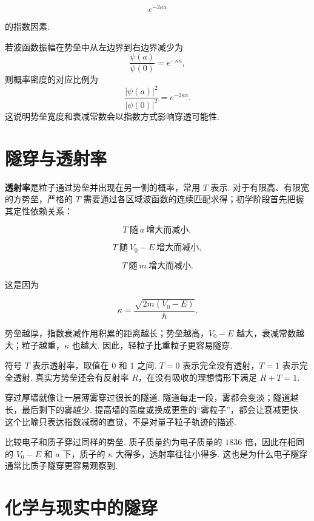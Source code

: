 \documentclass[UTF8,11pt,a4paper,openany]{ctexbook}
\newcommand{\term}[1]{\textbf{#1}}
\begin{document}
\[
e^{-2\kappa a}
\]

的指数因素. 

\begin{derivationbox}
若波函数振幅在势垒中从左边界到右边界减少为
\[
\frac{\psi(a)}{\psi(0)}=e^{-\kappa a},
\]
则概率密度的对应比例为
\[
\frac{|\psi(a)|^2}{|\psi(0)|^2}
=e^{-2\kappa a}.
\]
这说明势垒宽度和衰减常数会以指数方式影响穿透可能性. 
\end{derivationbox}

\section{隧穿与透射率}

\term{透射率}是粒子通过势垒并出现在另一侧的概率，常用 $T$ 表示. 对于有限高、有限宽的方势垒，严格的 $T$ 需要通过各区域波函数的连续匹配求得；初学阶段首先把握其定性依赖关系：

\[
T\ \text{随}\ a\ \text{增大而减小},
\]

\[
T\ \text{随}\ V_0-E\ \text{增大而减小},
\]

\[
T\ \text{随}\ m\ \text{增大而减小}.
\]

这是因为

\[
\kappa=\frac{\sqrt{2m(V_0-E)}}{\hbar}.
\]

势垒越厚，指数衰减作用积累的距离越长；势垒越高，$V_0-E$ 越大，衰减常数越大；粒子越重，$\kappa$ 也越大. 因此，轻粒子比重粒子更容易隧穿. 

\begin{notationbox}
符号 $T$ 表示透射率，取值在 $0$ 和 $1$ 之间. $T=0$ 表示完全没有透射，$T=1$ 表示完全透射. 真实方势垒还会有反射率 $R$，在没有吸收的理想情形下满足 $R+T=1$. 
\end{notationbox}

\begin{analogybox}
穿过厚墙就像让一层薄雾穿过很长的隧道. 隧道每走一段，雾都会变淡；隧道越长，最后剩下的雾越少. 提高墙的高度或换成更重的“雾粒子”，都会让衰减更快. 这个比喻只表达指数减弱的直觉，不是对量子粒子轨迹的描述. 
\end{analogybox}

\begin{examplebox}
比较电子和质子穿过同样的势垒. 质子质量约为电子质量的 $1836$ 倍，因此在相同的 $V_0-E$ 和 $a$ 下，质子的 $\kappa$ 大得多，透射率往往小得多. 这也是为什么电子隧穿通常比质子隧穿更容易观察到. 
\end{examplebox}

\section{化学与现实中的隧穿}
\end{document}
